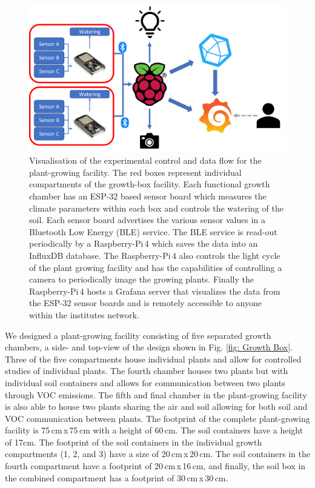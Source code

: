 \documentclass[reprint,superscriptaddress,aps,amsmath,amssymb]{revtex4-1}
\begin{document}
\begin{figure}
    \centering
    \includegraphics[width = \linewidth]{Data overview.png}
    \caption{Visualisation of the experimental control and data flow for the plant-growing facility. The red boxes represent individual compartments of the growth-box facility. Each functional growth chamber has an ESP-32 based sensor board which measures the climate parameters within each box and controls the watering of the soil. Each sensor board advertises the various sensor values in a Bluetooth Low Energy (BLE) service. The BLE service is read-out periodically by a Raspberry-Pi\,4 which saves the data into an InfluxDB database. The Raspberry-Pi\,4 also controls the light cycle of the plant growing facility and has the capabilities of controlling a camera to periodically image the growing plants. Finally the Raspberry-Pi\,4 hosts a Grafana server that visualizes the data from the ESP-32 sensor boards and is remotely accessible to anyone within the institutes network.}
    \label{fig:Data overview}
\end{figure}
We designed a plant-growing facility consisting of five separated growth chambers, a side- and top-view of the design shown in Fig. \ref{fig: Growth Box}. Three of the five compartments house individual plants and allow for controlled studies of individual plants. The fourth chamber houses two plants but with individual soil containers and allows for communication between two plants through VOC emissions. The fifth and final chamber in the plant-growing facility is also able to house two plants sharing the air and soil allowing for both soil and VOC communication between plants. The footprint of the complete plant-growing facility is 75\,cm\,x\,75\,cm with a height of 60\,cm. The soil containers have a height of 17cm. The footprint of the soil containers in the individual growth compartments (1, 2, and 3) have a size of 20\,cm\,x\,20\,cm. The soil containers in the fourth compartment have a footprint of  20\,cm\,x\,16\,cm, and finally, the soil box in the combined compartment has a footprint of 30\,cm\,x\,30\,cm.
\end{document}
